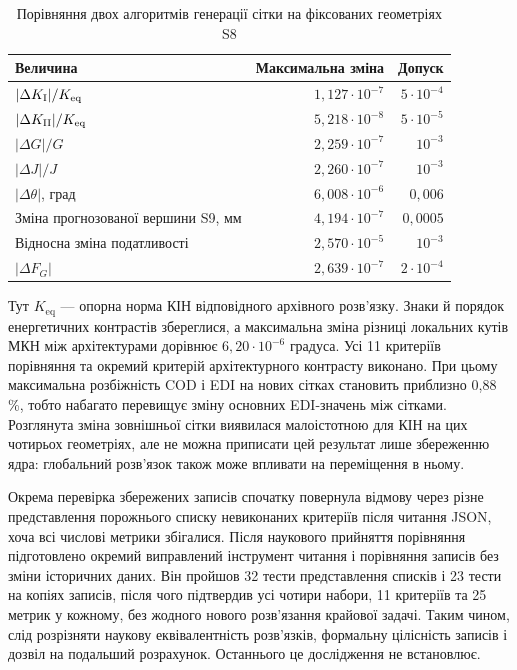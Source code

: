 \begin{table}[htbp]
 \centering
 \caption{Порівняння двох алгоритмів генерації сітки на фіксованих геометріях S8}
 \label{tab:ver-eq}
 \begin{tabularx}{\textwidth}{Xrr}
 \toprule
 Величина & Максимальна зміна & Допуск\\
 \midrule
 $|\Delta K_{\mathrm{I}}|/K_{\mathrm{eq}}$ & $1,127\cdot10^{-7}$ & $5\cdot10^{-4}$\\
 $|\Delta K_{\mathrm{II}}|/K_{\mathrm{eq}}$ & $5,218\cdot10^{-8}$ & $5\cdot10^{-5}$\\
 $|\Delta G|/G$ & $2,259\cdot10^{-7}$ & $10^{-3}$\\
 $|\Delta J|/J$ & $2,260\cdot10^{-7}$ & $10^{-3}$\\
 $|\Delta\theta|$, град & $6,008\cdot10^{-6}$ & $0,006$\\
 Зміна прогнозованої вершини S9, мм & $4,194\cdot10^{-7}$ & $0,0005$\\
 Відносна зміна податливості & $2,570\cdot10^{-5}$ & $10^{-3}$\\
 $|\Delta F_G|$ & $2,639\cdot10^{-7}$ & $2\cdot10^{-4}$\\
 \bottomrule
 \end{tabularx}
\end{table}
Тут $K_{\mathrm{eq}}$ --- опорна норма КІН відповідного архівного розв'язку. Знаки й порядок енергетичних контрастів збереглися, а максимальна зміна різниці локальних кутів МКН між архітектурами дорівнює $6{,}20\cdot10^{-6}$ градуса. Усі 11 критеріїв порівняння та окремий критерій архітектурного контрасту виконано. При цьому максимальна розбіжність COD і EDI на нових сітках становить приблизно 0,88\,\%, тобто набагато перевищує зміну основних EDI-значень між сітками. Розглянута зміна зовнішньої сітки виявилася малоістотною для КІН на цих чотирьох геометріях, але не можна приписати цей результат лише збереженню ядра: глобальний розв'язок також може впливати на переміщення в ньому.

Окрема перевірка збережених записів спочатку повернула відмову через різне представлення порожнього списку невиконаних критеріїв після читання JSON, хоча всі числові метрики збігалися. Після наукового прийняття порівняння підготовлено окремий виправлений інструмент читання і порівняння записів без зміни історичних даних. Він пройшов 32 тести представлення списків і 23 тести на копіях записів, після чого підтвердив усі чотири набори, 11 критеріїв та 25 метрик у кожному, без жодного нового розв'язання крайової задачі. Таким чином, слід розрізняти наукову еквівалентність розв'язків, формальну цілісність записів і дозвіл на подальший розрахунок. Останнього це дослідження не встановлює.

